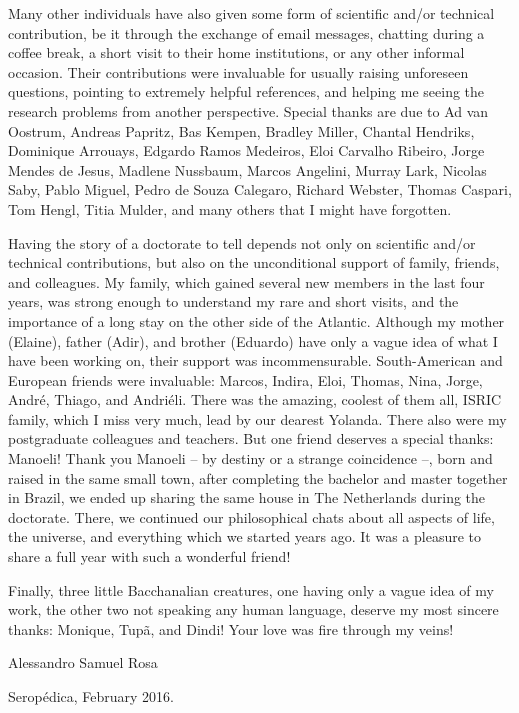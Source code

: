Many other individuals have also given some form of scientific and/or technical contribution, be it through 
the exchange of email messages, chatting during a coffee break, a short visit to their home institutions, or 
any other informal occasion. Their contributions were invaluable for usually raising unforeseen questions, 
pointing to extremely helpful references, and helping me seeing the research problems from another perspective.
Special thanks are due to Ad van Oostrum, Andreas Papritz, Bas Kempen, Bradley Miller, Chantal Hendriks, 
Dominique Arrouays, Edgardo Ramos Medeiros, Eloi Carvalho Ribeiro, Jorge Mendes de Jesus, Madlene Nussbaum, 
Marcos Angelini, Murray Lark, Nicolas Saby, Pablo Miguel, Pedro de Souza Calegaro, Richard Webster, Thomas 
Caspari, Tom Hengl, Titia Mulder, and many others that I might have forgotten.

Having the story of a doctorate to tell depends not only on scientific and/or technical contributions,
but also on the unconditional support of family, friends, and colleagues. My family, which gained several new 
members in the last four years, was strong enough to understand my rare and short visits, and the importance 
of 
a long stay on the other side of the Atlantic. Although my mother (Elaine), father (Adir), and brother 
(Eduardo) have only a vague idea of what I have been working on, their support was incommensurable. 
South-American and European friends were invaluable: Marcos, Indira, Eloi, Thomas, Nina, Jorge, André, Thiago, 
and Andriéli. There was the amazing, coolest of them all, ISRIC family, which I miss very much, lead by 
our dearest Yolanda. There also were my postgraduate colleagues and teachers. But one friend deserves a special 
thanks: 
Manoeli! Thank you Manoeli -- by destiny or a strange coincidence --, born and raised in the same small town, 
after completing the bachelor and master together in Brazil, we ended up sharing the same house in The 
Netherlands during the doctorate. There, we continued our philosophical chats about all aspects of life, the 
universe, and everything which we started years ago. It was a pleasure to share a full year with such a 
wonderful friend!

Finally, three little Bacchanalian creatures, one having only a vague idea of my work, the other two not 
speaking any human language, deserve my most sincere thanks: Monique, Tupã, and Dindi! Your love was fire 
through 
my veins!

\begin{flushright}
 Alessandro Samuel Rosa
 
 Seropédica, February 2016.
\end{flushright}
